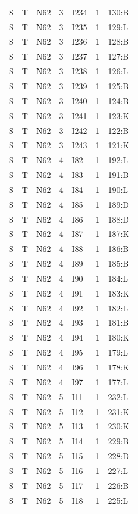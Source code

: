 {\begin{longtable}{lllrlrp{.35\linewidth}}
S & T & N62 & 3 & I234 & 1 & 130:B \\
S & T & N62 & 3 & I235 & 1 & 129:L \\
S & T & N62 & 3 & I236 & 1 & 128:B \\
S & T & N62 & 3 & I237 & 1 & 127:B \\
S & T & N62 & 3 & I238 & 1 & 126:L \\
S & T & N62 & 3 & I239 & 1 & 125:B \\
S & T & N62 & 3 & I240 & 1 & 124:B \\
S & T & N62 & 3 & I241 & 1 & 123:K \\
S & T & N62 & 3 & I242 & 1 & 122:B \\
S & T & N62 & 3 & I243 & 1 & 121:K \\
S & T & N62 & 4 & I82 & 1 & 192:L \\
S & T & N62 & 4 & I83 & 1 & 191:B \\
S & T & N62 & 4 & I84 & 1 & 190:L \\
S & T & N62 & 4 & I85 & 1 & 189:D \\
S & T & N62 & 4 & I86 & 1 & 188:D \\
S & T & N62 & 4 & I87 & 1 & 187:K \\
S & T & N62 & 4 & I88 & 1 & 186:B \\
S & T & N62 & 4 & I89 & 1 & 185:B \\
S & T & N62 & 4 & I90 & 1 & 184:L \\
S & T & N62 & 4 & I91 & 1 & 183:K \\
S & T & N62 & 4 & I92 & 1 & 182:L \\
S & T & N62 & 4 & I93 & 1 & 181:B \\
S & T & N62 & 4 & I94 & 1 & 180:K \\
S & T & N62 & 4 & I95 & 1 & 179:L \\
S & T & N62 & 4 & I96 & 1 & 178:K \\
S & T & N62 & 4 & I97 & 1 & 177:L \\
S & T & N62 & 5 & I11 & 1 & 232:L \\
S & T & N62 & 5 & I12 & 1 & 231:K \\
S & T & N62 & 5 & I13 & 1 & 230:K \\
S & T & N62 & 5 & I14 & 1 & 229:B \\
S & T & N62 & 5 & I15 & 1 & 228:D \\
S & T & N62 & 5 & I16 & 1 & 227:L \\
S & T & N62 & 5 & I17 & 1 & 226:B \\
S & T & N62 & 5 & I18 & 1 & 225:L \\

\end{longtable}}
